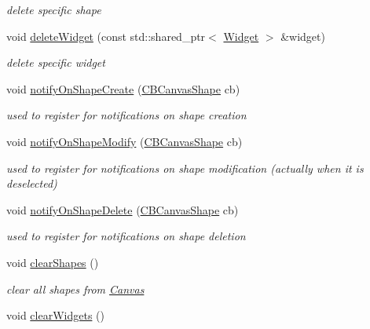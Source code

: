 \begin{DoxyCompactItemize}
\begin{DoxyCompactList}\small\item\em delete specific shape \end{DoxyCompactList}\item 
void \hyperlink{classcanvascv_1_1Canvas_ab72c0ea97fe435d9ce2aeffb4116faed}{delete\+Widget} (const std\+::shared\+\_\+ptr$<$ \hyperlink{classcanvascv_1_1Widget}{Widget} $>$ \&widget)\hypertarget{classcanvascv_1_1Canvas_ab72c0ea97fe435d9ce2aeffb4116faed}{}\label{classcanvascv_1_1Canvas_ab72c0ea97fe435d9ce2aeffb4116faed}

\begin{DoxyCompactList}\small\item\em delete specific widget \end{DoxyCompactList}\item 
void \hyperlink{classcanvascv_1_1Canvas_a64a459b16965e23de992cd2a301c68f4}{notify\+On\+Shape\+Create} (\hyperlink{classcanvascv_1_1Canvas_a6436ebb5dbadc3dbf9de3da8a499cf44}{C\+B\+Canvas\+Shape} cb)
\begin{DoxyCompactList}\small\item\em used to register for notifications on shape creation \end{DoxyCompactList}\item 
void \hyperlink{classcanvascv_1_1Canvas_a5a6da8ae08b08a20d7fe15564bda5515}{notify\+On\+Shape\+Modify} (\hyperlink{classcanvascv_1_1Canvas_a6436ebb5dbadc3dbf9de3da8a499cf44}{C\+B\+Canvas\+Shape} cb)
\begin{DoxyCompactList}\small\item\em used to register for notifications on shape modification (actually when it is deselected) \end{DoxyCompactList}\item 
void \hyperlink{classcanvascv_1_1Canvas_a1e7c26b39fd247e85941a6542f1b94c3}{notify\+On\+Shape\+Delete} (\hyperlink{classcanvascv_1_1Canvas_a6436ebb5dbadc3dbf9de3da8a499cf44}{C\+B\+Canvas\+Shape} cb)
\begin{DoxyCompactList}\small\item\em used to register for notifications on shape deletion \end{DoxyCompactList}\item 
void \hyperlink{classcanvascv_1_1Canvas_a8aa6686036b8a1a006718ae62f44b6c2}{clear\+Shapes} ()\hypertarget{classcanvascv_1_1Canvas_a8aa6686036b8a1a006718ae62f44b6c2}{}\label{classcanvascv_1_1Canvas_a8aa6686036b8a1a006718ae62f44b6c2}

\begin{DoxyCompactList}\small\item\em clear all shapes from \hyperlink{classcanvascv_1_1Canvas}{Canvas} \end{DoxyCompactList}\item 
void \hyperlink{classcanvascv_1_1Canvas_a94ee58b125af1d49baf921b7a65d0d8d}{clear\+Widgets} ()\hypertarget{classcanvascv_1_1Canvas_a94ee58b125af1d49baf921b7a65d0d8d}{}\label{classcanvascv_1_1Canvas_a94ee58b125af1d49baf921b7a65d0d8d}


\end{DoxyCompactItemize}
